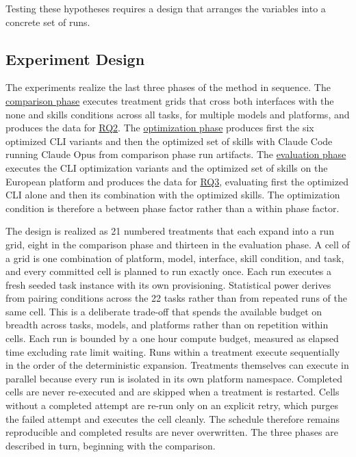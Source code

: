 \documentclass[
english,                 %
bibtex,                  %
]{kththesis}
\numberwithin{listing}{chapter}
\begin{document}
Testing these hypotheses requires a design that arranges the variables into a concrete set of runs.

\subsection{Experiment Design}
\label{sec:method_experiment_design}
\glsresetall

The experiments realize the last three phases of the method in sequence. The \hyperref[sec:method_comparison]{comparison phase} executes treatment grids that cross both interfaces with the none and skills conditions across all tasks, for multiple models and platforms, and produces the data for \hyperref[rq2]{RQ2}. The \hyperref[sec:method_optimization]{optimization phase} produces first the six optimized \gls{CLI} variants and then the optimized set of skills with Claude Code running Claude Opus from comparison phase run artifacts. The \hyperref[sec:method_evaluation]{evaluation phase} executes the \gls{CLI} optimization variants and the optimized set of skills on the European platform and produces the data for \hyperref[rq3]{RQ3}, evaluating first the optimized \gls{CLI} alone and then its combination with the optimized skills. The optimization condition is therefore a between phase factor rather than a within phase factor.

The design is realized as 21 numbered treatments that each expand into a run grid, eight in the comparison phase and thirteen in the evaluation phase. A cell of a grid is one combination of platform, model, interface, skill condition, and task, and every committed cell is planned to run exactly once. Each run executes a fresh seeded task instance with its own provisioning. Statistical power derives from pairing conditions across the 22 tasks rather than from repeated runs of the same cell. This is a deliberate trade-off that spends the available budget on breadth across tasks, models, and platforms rather than on repetition within cells. Each run is bounded by a one hour compute budget, measured as elapsed time excluding rate limit waiting. Runs within a treatment execute sequentially in the order of the deterministic expansion. Treatments themselves can execute in parallel because every run is isolated in its own platform namespace. Completed cells are never re-executed and are skipped when a treatment is restarted. Cells without a completed attempt are re-run only on an explicit retry, which purges the failed attempt and executes the cell cleanly. The schedule therefore remains reproducible and completed results are never overwritten. The three phases are described in turn, beginning with the comparison.
\end{document}
